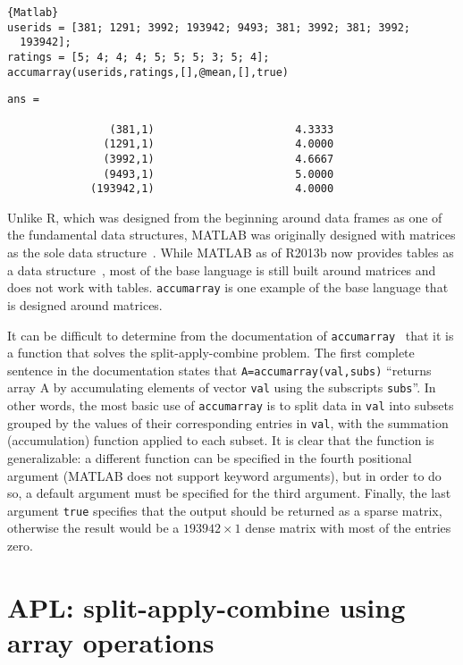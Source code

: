 \documentclass[11pt]{asaproc}
\begin{document}
\begin{lstlisting}{Matlab}
userids = [381; 1291; 3992; 193942; 9493; 381; 3992; 381; 3992;
  193942];
ratings = [5; 4; 4; 4; 5; 5; 5; 3; 5; 4];
accumarray(userids,ratings,[],@mean,[],true)
\end{lstlisting}
\begin{verbatim}
ans =

                (381,1)                      4.3333
               (1291,1)                      4.0000
               (3992,1)                      4.6667
               (9493,1)                      5.0000
             (193942,1)                      4.0000
\end{verbatim}

Unlike R, which was designed from the beginning around data frames as one of
the fundamental data structures, MATLAB was originally designed with matrices
as the sole data structure~\cite{Moler1980,Moler1982}. While MATLAB as of
R2013b now provides tables as a data structure~\cite{Shure2013}, most of the
base language is still built around matrices and does not work with tables.
\lstinline|accumarray| is one example of the base language that is designed
around matrices.

It can be difficult to determine from the documentation of
\lstinline|accumarray|~\cite{accumarray} that it is a function that solves the
split-apply-combine problem. The first complete sentence in the documentation
states that \lstinline|A=accumarray(val,subs)| ``returns array A by
accumulating elements of vector \lstinline|val| using the subscripts
\lstinline|subs|''. In other words, the most basic use of
\lstinline|accumarray| is to split data in  \lstinline|val| into subsets
grouped by the values of their corresponding entries in \lstinline|val|, with
the summation (accumulation) function applied to each subset. It is clear that
the function is generalizable: a different function can be specified in the
fourth positional argument (MATLAB does not support keyword arguments), but in
order to do so, a default argument must be specified for the third argument.
Finally, the last argument \lstinline|true| specifies that the output should be
returned as a sparse matrix, otherwise the result would be a $193942\times1$
dense matrix with most of the entries zero.



\section{APL: split-apply-combine using array operations}
\end{document}
